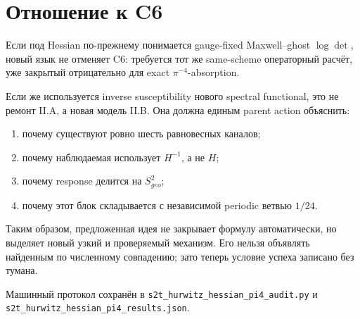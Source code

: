 \documentclass[12pt,a4paper]{article}
\begin{document}
\section{Отношение к C6}

Если под Hessian по-прежнему понимается gauge-fixed Maxwell--ghost
$\log\det$, новый язык не отменяет C6: требуется тот же same-scheme операторный
расчёт, уже закрытый отрицательно для exact $\pi^{-4}$-absorption.

Если же используется inverse susceptibility нового spectral functional, это
не ремонт II.A, а новая модель II.B. Она должна единым parent action объяснить:
\begin{enumerate}
 \item почему существуют ровно шесть равновесных каналов;
 \item почему наблюдаемая использует $H^{-1}$, а не $H$;
 \item почему response делится на $S_{geo}^2$;
 \item почему этот блок складывается с независимой periodic ветвью $1/24$.
\end{enumerate}

Таким образом, предложенная идея не закрывает формулу автоматически, но
выделяет новый узкий и проверяемый механизм. Его нельзя объявлять найденным по
численному совпадению; зато теперь условие успеха записано без тумана.

Машинный протокол сохранён в
\texttt{s2t\_hurwitz\_hessian\_pi4\_audit.py} и
\texttt{s2t\_hurwitz\_hessian\_pi4\_results.json}.
\end{document}
